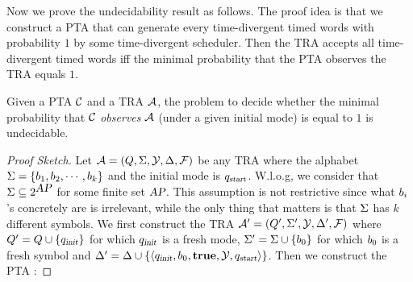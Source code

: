 Now we prove the undecidability result as follows.
The proof idea is that we construct a PTA that can generate every time-divergent timed words with probability $1$ by some time-divergent scheduler.
Then the TRA accepts all time-divergent timed words iff the minimal probability that the PTA observes the TRA equals $1$.
%
\begin{theorem}\label{thm:traundecidability}
Given a PTA $\mathcal{C}$ and a TRA $\mathcal{A}$, the problem to decide whether the minimal probability
that $\mathcal{C}$ \emph{observes} $\mathcal{A}$ (under a given initial mode) is equal to $1$ is undecidable.
\end{theorem}
%
\begin{proof}[Proof Sketch]
Let $\mathcal{A}=(Q,\Sigma,\mathcal{Y},\Delta,\mathcal{F})$ be any TRA where the alphabet $\Sigma = \{b_{1}, b_{2}, \cdots, b_{k}\}$ and the initial mode is $q_{\mbox{\sl\scriptsize start}}$.
W.l.o.g, we consider that $\Sigma\subseteq 2^{\mbox{\sl AP}}$ for some finite set $\mbox{\sl AP}$.
This assumption is not restrictive since what $b_{i}$'s concretely are is irrelevant, while the only thing that matters is that $\Sigma$ has $k$ different symbols.
We first construct the TRA $\mathcal{A}' = (Q', \Sigma', \mathcal{Y}, \Delta',\mathcal{F})$ where
$Q'   = Q  \cup \{ q_{\mbox{\sl\scriptsize init} } \}$ for which $q_{\mbox{\sl\scriptsize init} }$ is a fresh mode,
$\Sigma'  = \Sigma \cup \{ b_{0} \}$ for which $b_{0}$ is a fresh symbol and 
$\Delta'     = \Delta    \cup \{ \langle
            q_{\mbox{\sl\scriptsize init} },
            b_{0},
            \mathbf{true},
            \mathcal{Y},
            q_{\mbox{\sl\scriptsize start}}
        \rangle
    \}$.
Then we construct the PTA :

\end{proof}
